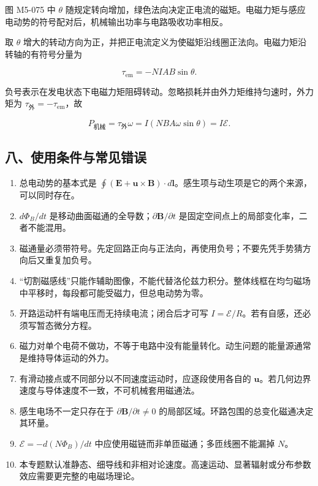 图 M5-075 中 \(\theta\)
随规定转向增加，绿色法向决定正电流的磁矩。电磁力矩与感应电动势的符号配对后，机械输出功率与电路吸收功率相反。

取 \(\theta\)
增大的转动方向为正，并把正电流定义为使磁矩沿线圈正法向。电磁力矩沿转轴的有符号分量为

\[
\tau_{\mathrm{em}}=-NIAB\sin\theta.
\]

负号表示在发电状态下电磁力矩阻碍转动。忽略损耗并由外力矩维持匀速时，外力矩为
\(\tau_{\mathrm{\text{外}}}=-\tau_{\mathrm{em}}\)，故

\[
P_{\mathrm{\text{机械}}}=\tau_{\mathrm{\text{外}}}\omega
=I(NBA\omega\sin\theta)
=I\mathcal E.
\]

\subsection{八、使用条件与常见错误}\label{m5:ux516bux4f7fux7528ux6761ux4ef6ux4e0eux5e38ux89c1ux9519ux8bef}

\begin{enumerate}
\def\labelenumi{\arabic{enumi}.}
\tightlist
\item
  总电动势的基本式是
  \(\oint(\mathbf E+\mathbf u\times\mathbf B)\cdot d\mathbf l\)。感生项与动生项是它的两个来源，可以同时存在。
\item
  \(d\Phi_B/dt\)
  是移动曲面磁通的全导数；\(\partial\mathbf B/\partial t\)
  是固定空间点上的局部变化率，二者不能混用。
\item
  磁通量必须带符号。先定回路正向与正法向，再使用负号；不要先凭手势猜方向后又重复加负号。
\item
  ``切割磁感线''只能作辅助图像，不能代替洛伦兹力积分。整体线框在均匀磁场中平移时，每段都可能受磁力，但总电动势为零。
\item
  开路运动杆有端电压而无持续电流；闭合后才可写
  \(I=\mathcal E/R\)。若有自感，还必须写暂态微分方程。
\item
  磁力对单个电荷不做功，不等于电路中没有能量转化。动生问题的能量源通常是维持导体运动的外力。
\item
  有滑动接点或不同部分以不同速度运动时，应逐段使用各自的
  \(\mathbf u\)。若几何边界速度与导体速度不一致，不可机械套用磁通法。
\item
  感生电场不一定只存在于 \(\partial\mathbf B/\partial t\ne0\)
  的局部区域。环路包围的总变化磁通决定其环量。
\item
  \(\mathcal E=-d(N\Phi_B)/dt\)
  中应使用磁链而非单匝磁通；多匝线圈不能漏掉 \(N\)。
\item
  本专题默认准静态、细导线和非相对论速度。高速运动、显著辐射或分布参数效应需要更完整的电磁场理论。
\end{enumerate}

